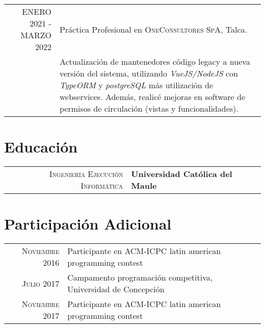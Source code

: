 \documentclass[a4paper,10pt]{article} %
\begin{document}
\begin{tabular}{r|p{11cm}}

\textsc{ENERO 2021 - MARZO 2022} & Pr\'actica Profesional en \textsc{OneConsultores SpA}, Talca. \emph{}\\
& \footnotesize{
    Actualizaci\'on de mantenedores c\'odigo legacy a nueva versi\'on del sistema, utilizando \textit{VueJS/NodeJS} con \textit{TypeORM} y \textit{postgreSQL} m\'as utilizaci\'on de webservices. Adem\'as, realic\'e mejoras en software de permisos de circulaci\'on (vistas y funcionalidades).
}
\multicolumn{2}{c}{}

\end{tabular}



\section{Educaci\'on}
\begin{tabular}{rl}	


\textsc{Ingenier\'ia Ejecuci\'on Inform\'atica} & \textbf{Universidad Cat\'olica del Maule}
&


\end{tabular}


\section{Participaci\'on Adicional}

\begin{tabular}{rl}
\textsc{Noviembre} 2016 & Participante en ACM-ICPC latin american programming contest\\

\textsc{Julio} 2017 & Campamento programaci\'on competitiva, Universidad de Concepci\'on\\

\textsc{Noviembre} 2017 & Participante en ACM-ICPC latin american programming contest\\

\end{tabular}
\end{document}
